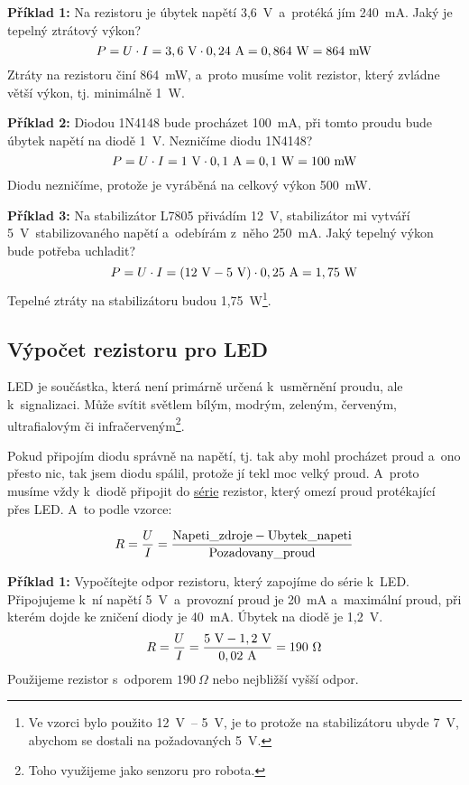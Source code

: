 {\bf Příklad 1:} Na rezistoru je úbytek napětí 3,6~V~a~protéká jím 240~mA. Jaký je tepelný ztrátový výkon?
$$P = U \cdot I = \rm 3,6\ V \cdot 0,24\ A = 0,864\ W = 864\ mW$$
Ztráty na rezistoru činí 864~mW, a~proto musíme volit rezistor, který zvládne větší výkon, tj. minimálně 1~W. 

{\bf Příklad 2:} Diodou 1N4148 bude procházet 100~mA, při tomto proudu bude úbytek napětí na diodě 1~V. Nezničíme diodu 1N4148?
$$P = U \cdot I = \rm 1\ V \cdot 0,1\ A = 0,1\ W = 100\ mW$$
Diodu nezničíme, protože je vyráběná na celkový výkon 500~mW. 

{\bf Příklad 3:} Na stabilizátor L7805 přivádím 12~V, 
stabilizátor mi vytváří 5~V~stabilizovaného napětí a~odebírám z~něho 250~mA. 
Jaký tepelný výkon bude potřeba uchladit?
$$P = U \cdot I = \rm (12\ V - 5\ V) \cdot 0,25\ A = 1,75\ W$$
Tepelné ztráty na stabilizátoru budou 1,75~W\footnote{Ve vzorci bylo použito 12~V~-- 5~V,
	 je to protože na stabilizátoru ubyde 7~V, abychom se dostali na požadovaných 5~V.}.


\subsection{Výpočet rezistoru pro LED} \label{vypocet_rezistor}

LED  je součástka, 
která není primárně určená k~usměrnění proudu, ale k~signalizaci. 
Může svítit světlem bílým, modrým, zeleným, červeným, ultrafialovým či infračerveným\footnote{Toho využijeme jako senzoru pro robota.}.

Pokud připojím diodu správně na napětí, tj. tak aby mohl procházet proud a~ono přesto nic,
 tak jsem diodu spálil, protože jí tekl moc velký proud. A~proto musíme vždy k~diodě připojit do  
 \hyperref[seriove]{série}  rezistor, který omezí proud protékající přes LED. A~to podle vzorce:

$$R = \frac{U}{I} = \rm \frac{Napeti\_zdroje - Ubytek\_napeti}{Pozadovany\_proud}$$

{\bf Příklad 1:} Vypočítejte odpor rezistoru, který zapojíme do série k~LED. 
Připojujeme k~ní napětí 5~V~a~provozní proud je 20~mA a~maximální proud, při kterém dojde ke zničení diody je 40~mA. Úbytek na diodě je 1,2~V.
$$R = \frac{U}{I} = \rm \frac{5\ V - 1,2 \ V}{0,02 \ A} = 190\ \Omega$$
Použijeme rezistor s~odporem $190\ \Omega$ nebo nejbližší vyšší odpor.

